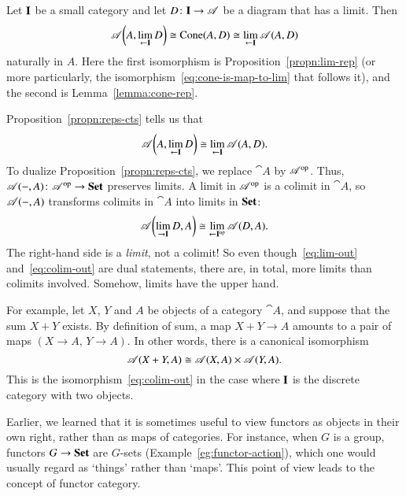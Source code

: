\begin{pf}
Let $\mathbf{I}$ be a small category and let $D\from \scat{I} \to \cat{A}$ be a
diagram that has a limit.  Then
\[
\mathscr{A}\biggl(A, \lim\limits_{\leftarrow \mathbf{I}} D\biggr)
\cong
\operatorname{Cone}(A, D)
\cong
\lim\limits_{\leftarrow \mathbf{I}} \mathscr{A}(A, D)
\]
naturally in $A$.  Here the first isomorphism is
Proposition~\ref{propn:lim-rep} (or more particularly, the
isomorphism~\eqref{eq:cone-is-map-to-lim} that follows it), and the second is
Lemma~\ref{lemma:cone-rep}.
\end{pf}

\begin{remark}  
\label{rmk:rep-pres}
Proposition~\ref{propn:reps-cts} tells us that
% 
\begin{equation}        
\label{eq:lim-out}
\cat{A} \biggl(A, \lt{\scat{I}} D\biggr)
\iso
\lt{\scat{I}} \cat{A}(A, D).
%
\index{limit!map into}
%
\end{equation}
% 
To dualize Proposition~\ref{propn:reps-cts}, we replace $\cat{A}$ by
$\mathscr{A}^{\mathrm{op}}$.  Thus, $\cat{A}(\dashbk, A)\from \cat{A}^\op \to \Set$
preserves limits.  A limit in $\mathscr{A}^{\mathrm{op}}$ is a colimit in $\cat{A}$, so
$\mathscr{A}(-, A)$ transforms colimits in $\cat{A}$ into limits in
$\mathbf{Set}$:
% 
\begin{equation}
\label{eq:colim-out}
\cat{A}\biggl(\colt{\scat{I}} D, A\biggr)
\iso
\lt{\scat{I}^{\op}} \cat{A}(D, A).
%
\index{colimit!map out of}
%
\end{equation}
% 
The right-hand side is a \emph{limit}, not%
%
%
a colimit!  So even though~\eqref{eq:lim-out} and~\eqref{eq:colim-out} are
dual statements, there are, in total, more limits than colimits involved.
Somehow, limits have the upper hand.

For example, let $X$, $Y$ and $A$ be objects of a category $\cat{A}$, and
suppose that the sum $X + Y$ exists.  By definition of sum, a map $X + Y
\to A$%
%
%
amounts to a pair of maps $(X \to A,\, Y \to A)$.  In other words, there is
a canonical isomorphism
\[
\mathscr{A}(X + Y, A) 
\cong
\mathscr{A}(X, A) \times \mathscr{A}(Y, A).
\]
This is the isomorphism~\eqref{eq:colim-out} in the case where $\mathbf{I}$ is
the discrete category with two objects.%
%
%
\end{remark}


%
%
%
%

Earlier, we learned that it is sometimes useful to view functors as objects
in their own right, rather than as maps of categories.  For instance, when
$G$ is a group, functors $G \to \mathbf{Set}$ are $G$-sets
(Example~\ref{eg:functor-action}), which one would usually regard as
`things' rather than `maps'.  This point of view leads to the concept of
functor category.

